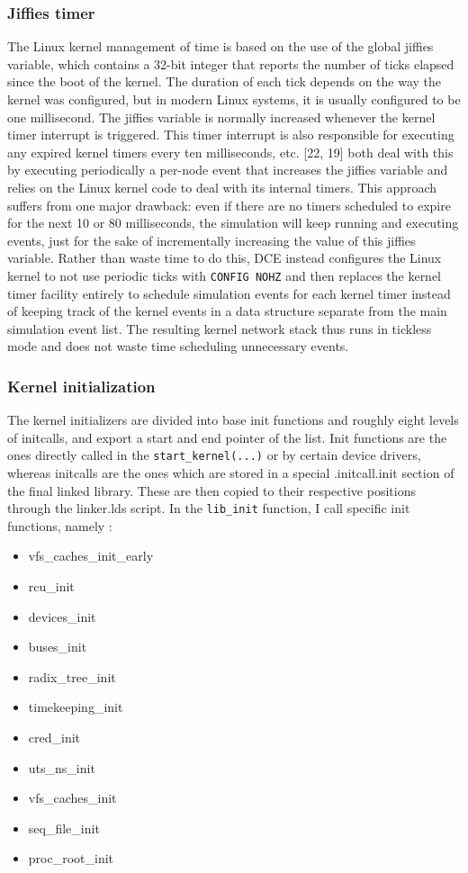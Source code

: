 \documentclass{sig-alternate}
\begin{document}
\subsubsection{Jiffies timer}
The Linux kernel management of time is based on the use of the global jiffies variable,
which contains a 32-bit integer that reports the number of ticks elapsed since the boot of
the kernel. The duration of each tick depends on the way the kernel was configured, but in modern Linux systems, it is usually configured to be one millisecond. The jiffies variable is normally
increased whenever the kernel timer interrupt is triggered. This timer interrupt is also
responsible for executing any expired kernel timers every ten milliseconds, etc.
[22, 19] both deal with this by executing periodically a per-node event that increases
the jiffies variable and relies on the Linux kernel code to deal with its internal timers. This
approach suffers from one major drawback: even if there are no timers scheduled to
expire for the next 10 or 80 milliseconds, the simulation will keep running and executing
events, just for the sake of incrementally increasing the value of this jiffies variable.
Rather than waste time to do this, DCE instead configures the Linux kernel to not use periodic
ticks with \texttt{CONFIG NOHZ} and then replaces the kernel timer facility entirely to schedule
simulation events for each kernel timer instead of keeping track of the kernel events in a
data structure separate from the main simulation event list. The resulting kernel network
stack thus runs in tickless mode and does not waste time scheduling unnecessary events.


\subsubsection{Kernel initialization}
The kernel initializers are divided into base init functions and roughly eight levels of initcalls, and export a start and end pointer of the list. 
Init functions are the ones directly called in the \texttt{start\_kernel(...)} or by certain device drivers, whereas initcalls are the ones which are stored 
in a special .initcall.init section of the final linked library. These are then copied to their respective positions through the linker.lds script.
In the \texttt{lib\_init} function, I call specific init functions, namely : 

\begin{itemize}
\item vfs\_caches\_init\_early
\item rcu\_init
\item devices\_init 
\item buses\_init
\item radix\_tree\_init
\item timekeeping\_init
\item cred\_init
\item uts\_ns\_init 
\item vfs\_caches\_init 
\item seq\_file\_init 
\item proc\_root\_init
\end{itemize}
\end{document}
